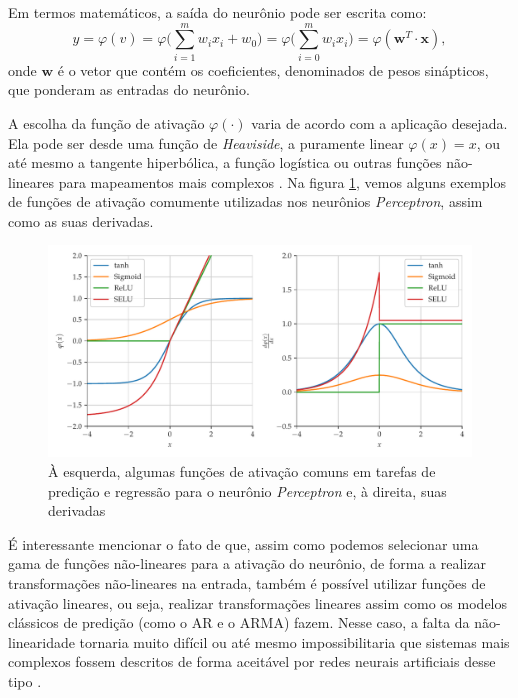 \documentclass[a4paper, 12pt]{article}
\begin{document}
Em termos matemáticos, a saída do neurônio pode ser escrita como:
\begin{equation}\label{eq:mlp-out}
y = \varphi(v) = \varphi  \Big(\sum_{i=1}^{m}w_i x_i + w_0 \Big) = \varphi \Big(\sum_{i=0}^{m}w_i x_i \Big) = \varphi (\mathbf{w}^T \cdot \mathbf{x}),
\end{equation}
onde $\mathbf{w}$ é o vetor que contém os coeficientes, denominados de pesos sinápticos, que ponderam as entradas do neurônio. 

A escolha da função de ativação $\varphi (\cdot)$ varia de acordo com a aplicação desejada. Ela pode ser desde uma função de \textit{Heaviside}, a puramente linear $\varphi(x) = x$, ou até mesmo a tangente hiperbólica, a função logística ou outras funções não-lineares para mapeamentos mais complexos \cite{geron2019hands}. Na figura \ref{fig:mlp-activations}, vemos alguns exemplos de funções de ativação comumente utilizadas nos neurônios \textit{Perceptron}, assim como as suas derivadas. 

\begin{figure}[!ht]
	\centering
	\includegraphics[scale = 0.7]{mlp-activations.pdf}
	\caption{À esquerda, algumas funções de ativação comuns em tarefas de predição e regressão para o neurônio \textit{Perceptron} e, à direita, suas derivadas}
	\label{fig:mlp-activations}
\end{figure}

É interessante mencionar o fato de que, assim como podemos selecionar uma gama de funções não-lineares para a ativação do neurônio, de forma a realizar transformações não-lineares na entrada, também é possível utilizar funções de ativação lineares, ou seja, realizar transformações lineares assim como os modelos clássicos de predição (como o AR e o ARMA) fazem. Nesse caso, a falta da não-linearidade tornaria muito difícil ou até mesmo impossibilitaria que sistemas mais complexos fossem descritos de forma aceitável por redes neurais artificiais desse tipo \cite{hornik1989multilayer}.
\end{document}
